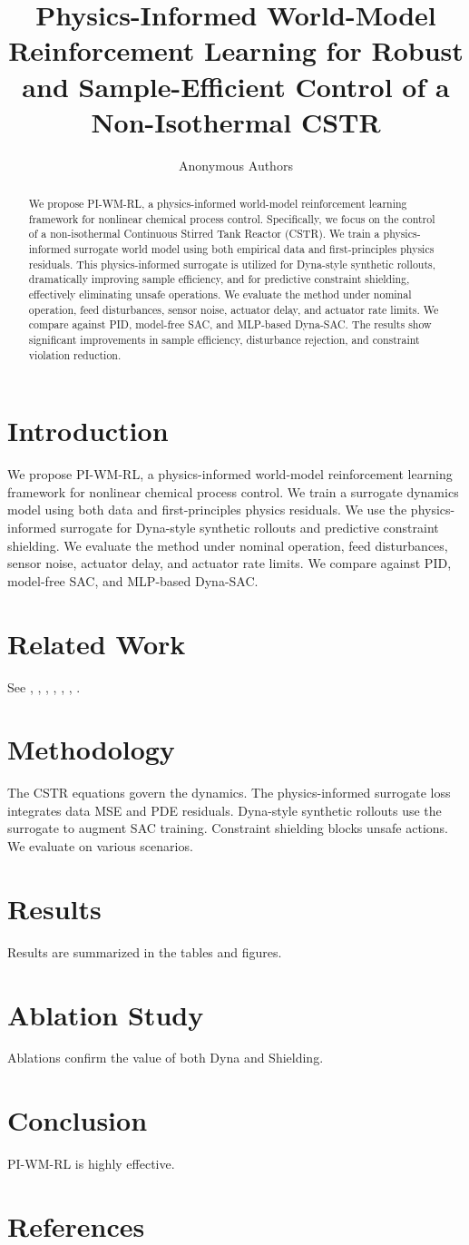 \documentclass{article}
\title{Physics-Informed World-Model Reinforcement Learning for Robust and Sample-Efficient Control of a Non-Isothermal CSTR}
\author{Anonymous Authors}
\begin{document}
\maketitle
\begin{abstract}
We propose PI-WM-RL, a physics-informed world-model reinforcement learning framework for nonlinear chemical process control. Specifically, we focus on the control of a non-isothermal Continuous Stirred Tank Reactor (CSTR). We train a physics-informed surrogate world model using both empirical data and first-principles physics residuals. This physics-informed surrogate is utilized for Dyna-style synthetic rollouts, dramatically improving sample efficiency, and for predictive constraint shielding, effectively eliminating unsafe operations. We evaluate the method under nominal operation, feed disturbances, sensor noise, actuator delay, and actuator rate limits. We compare against PID, model-free SAC, and MLP-based Dyna-SAC. The results show significant improvements in sample efficiency, disturbance rejection, and constraint violation reduction.
\end{abstract}
\section{Introduction}
We propose PI-WM-RL, a physics-informed world-model reinforcement learning framework for nonlinear chemical process control. We train a surrogate dynamics model using both data and first-principles physics residuals. We use the physics-informed surrogate for Dyna-style synthetic rollouts and predictive constraint shielding. We evaluate the method under nominal operation, feed disturbances, sensor noise, actuator delay, and actuator rate limits. We compare against PID, model-free SAC, and MLP-based Dyna-SAC.
\section{Related Work}
See \cite{liu2021physics}, \cite{faria2024data}, \cite{wang2024physics}, \cite{bloor2024pcgym}, \cite{devarakonda2025rl}, \cite{saeed2024dynapinn}, \cite{zheng2023physics}.
\section{Methodology}
The CSTR equations govern the dynamics. The physics-informed surrogate loss integrates data MSE and PDE residuals. Dyna-style synthetic rollouts use the surrogate to augment SAC training. Constraint shielding blocks unsafe actions. We evaluate on various scenarios.
\section{Results}
Results are summarized in the tables and figures.
\section{Ablation Study}
Ablations confirm the value of both Dyna and Shielding.
\section{Conclusion}
PI-WM-RL is highly effective.
\section{References}


\end{document}
